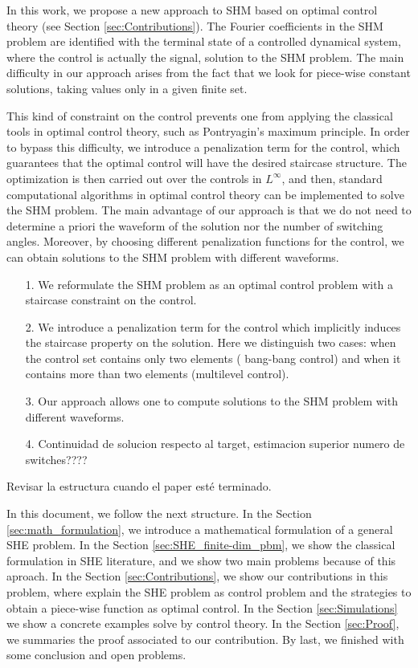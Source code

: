 \documentclass[twocolumn]{autart}    %
\begin{document}
In this work, we propose a new approach to SHM based on optimal control theory (see Section \ref{sec:Contributions}). The Fourier coefficients in the SHM problem are identified with the terminal state of a controlled dynamical system, where the control is actually the signal, solution to the SHM problem. The main difficulty in our approach arises from the fact that we look for piece-wise constant solutions, taking values only in a given finite set.

This kind of constraint on the control prevents one from applying the classical tools in optimal control theory, such as Pontryagin's maximum principle. In order to bypass this difficulty, we introduce a penalization term for the control, which guarantees that the optimal control will have the desired staircase structure. The optimization is then carried out over the controls in $L^\infty$, and then, standard computational algorithms in optimal control theory can be implemented to solve the SHM problem. The main advantage of our approach is that we do not need to determine a priori the waveform of the solution nor the number of switching angles. Moreover, by choosing different penalization functions for the control, we can obtain solutions to the SHM problem with different waveforms.

\begin{enumerate}
    \item[1.] We reformulate the SHM problem as an optimal control problem with a staircase constraint on the control.
    \item[2.] We introduce a penalization term for the control which implicitly induces the staircase property on the solution. Here we distinguish two cases: when the control set contains only two elements ( bang-bang control) and when it contains more than two elements (multilevel control).
    \item[3.] Our approach allows one to compute solutions to the SHM problem with different waveforms.
    \item[4.] {\color{red} Continuidad de solucion respecto al target, estimacion superior numero de switches???? }
\end{enumerate}

{\color{red} Revisar la estructura cuando el paper est\'e terminado.

In this document, we follow the next structure. In the Section \ref{sec:math_formulation}, we introduce a mathematical formulation of a general SHE problem. 
%
In the Section \ref{sec:SHE_finite-dim_pbm}, we show the classical formulation in SHE literature, and we show two main problems because of this aproach. 
%
In the Section \ref{sec:Contributions}, we show our contributions in this problem, where explain the SHE problem as control problem and the strategies to obtain a piece-wise function as optimal control. 
%
In the Section \ref{sec:Simulations} we show a concrete examples solve by control theory. 
%
In the Section \ref{sec:Proof}, we summaries the proof associated to our contribution. 
%
By last, we finished with some conclusion and open problems. 
}
\end{document}
